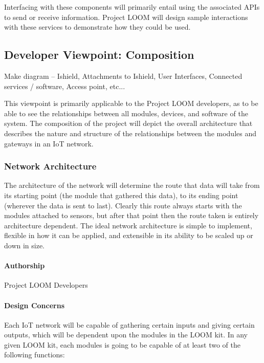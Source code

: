 \documentclass[onecolumn, draftclsnofoot,10pt, compsoc]{IEEEtran}
\begin{document}
    Interfacing with these components will primarily entail using the associated APIs to send or receive information. Project LOOM will design sample interactions with these services to demonstrate how they could be used.






\subsection{Developer Viewpoint: Composition}
    Make diagram – Ishield, Attachments to Ishield, User Interfaces, Connected services / software, Access point, etc...

    This viewpoint is primarily applicable to the Project LOOM developers, as to be able to see the relationships between all modules, devices, and software of the system. The composition of the project will depict the overall architecture that describes the nature and structure of the relationships between the modules and gateways in an IoT network.

\subsubsection{Network Architecture}
    The architecture of the network will determine the route that data will take from its starting point (the module that gathered this data), to its ending point (wherever the data is sent to last). Clearly this route always starts with the modules attached to sensors, but after that point then the route taken is entirely architecture dependent. The ideal network architecture is simple to implement, flexible in how it can be applied, and extensible in its ability to be scaled up or down in size. 

\paragraph{Authorship}
    Project LOOM Developers

\paragraph{Design Concerns}
    Each IoT network will be capable of gathering certain inputs and giving certain outputs, which will be dependent upon the modules in the LOOM kit. In any given LOOM kit, each modules is going to be capable of at least two of the following functions:
\end{document}
